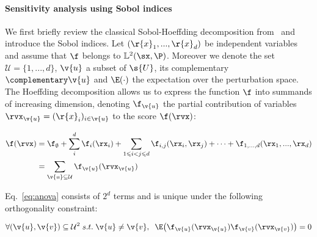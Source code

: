 \paragraph{Sensitivity analysis using Sobol indices}
\label{sec:sobol_indices}

We first briefly review the classical Sobol-Hoeffding decomposition from~\cite{hoeffding1948} and introduce the Sobol indices. Let $(\r{x}_1,...,\r{x}_d)$ be independent variables and assume that $\f$ belongs to $\mathbb{L}^2(\sx,\P)$. Moreover we denote the set $\mathcal{U} =\{1, ..., d\}$, $\v{u}$ a subset of $\s{U}$, its complementary ${\complementary}\v{u}$ and $\E(\cdot)$ the expectation over the perturbation space. The Hoeffding decomposition allows us to express the function $\f$ into summands of increasing dimension, denoting $\f_{\v{u}}$ the partial contribution of variables $\rvx_{\v{u}} = (\r{x}_i)_{i \in \v{u}}$ to the score $\f(\rvx)$:

\begin{equation}
    \label{eq:anova}
    \begin{aligned}
    \f(\rvx) &= \f_{\emptyset} + \sum_i^d \f_i(\rx_i)
    + \sum_{1 \leqslant i < j \leqslant d} \f_{i,j}(\rx_i, \rx_j)
    + \cdots + \f_{1,...,d}(\rx_1, ..., \rx_d) \\
    &= \sum_{\substack{\v{u} \subseteq \mathcal{U}}} \f_{\v{u}}(\rvx_{\v{u}})
    \end{aligned}
\end{equation}

Eq.~\ref{eq:anova} consists of $2^d$ terms and is unique under the following orthogonality constraint:

\begin{equation}
    \label{eq:anova_ortho}
    \begin{aligned}
    \forall (\v{u},\v{v}) \subseteq \mathcal{U}^2 \; s.t. \;  \v{u} \neq \v{v}, \;\; \E\big(\f_{\v{u}}(\rvx_{\v{u}}) \f_{\v{v}}(\rvx_{\v{v}})\big) = 0
    \end{aligned}
\end{equation}

